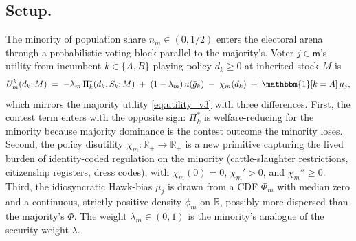 \documentclass[11pt,twoside]{extarticle}
\begin{document}
\subsection*{Setup.}

The minority of population share $n_m\in(0,1/2)$ enters the electoral arena through a probabilistic-voting block parallel to the majority's. Voter $j\in\mathsf{m}$'s utility from incumbent $k\in\{A,B\}$ playing policy $d_k\ge 0$ at inherited stock $M$ is
\begin{equation}\label{eq:utility_minority_oaF}
    U^k_m(d_k;M)\;=\;-\lambda_m\,\Pi_k^*(d_k,S_k;M)\;+\;(1-\lambda_m)\,u(\bar g_k)\;-\;\chi_m(d_k)\;+\;\mathbbm{1}[k=A]\,\mu_j,
\end{equation}
which mirrors the majority utility \eqref{eq:utility_v3} with three differences. First, the contest term enters with the opposite sign: $\Pi_k^*$ is welfare-reducing for the minority because majority dominance is the contest outcome the minority loses. Second, the policy disutility $\chi_m:\mathbb{R}_+\to\mathbb{R}_+$ is a new primitive capturing the lived burden of identity-coded regulation on the minority (cattle-slaughter restrictions, citizenship registers, dress codes), with $\chi_m(0)=0$, $\chi_m'>0$, and $\chi_m''\ge 0$. Third, the idiosyncratic Hawk-bias $\mu_j$ is drawn from a CDF $\Phi_m$ with median zero and a continuous, strictly positive density $\phi_m$ on $\mathbb{R}$, possibly more dispersed than the majority's $\Phi$. The weight $\lambda_m\in(0,1)$ is the minority's analogue of the security weight $\lambda$.
\end{document}
